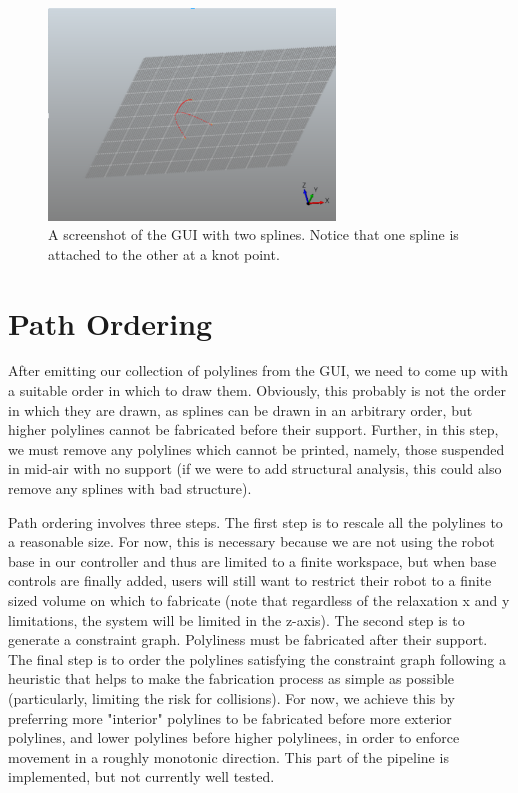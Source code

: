 \documentclass[conference]{acmsiggraph}
\begin{document}
\begin{figure}[ht]
  \centering
  \includegraphics[width=3.0in]{images/GUI.png}
  \caption{A screenshot of the GUI with two splines.  Notice that one spline is attached to the other at a knot point.}
  \label{fig:GUI}
\end{figure}

\section{Path Ordering}
After emitting our collection of polylines from the GUI, we need to come up with a suitable order in which to draw them.  Obviously, this probably is not the order in which they are drawn, as splines can be drawn in an arbitrary order, but higher polylines cannot be fabricated before their support.  Further, in this step, we must remove any polylines which cannot be printed, namely, those suspended in mid-air with no support (if we were to add structural analysis, this could also remove any splines with bad structure).

Path ordering involves three steps.  The first step is to rescale all the polylines to a reasonable size.  For now, this is necessary because we are not using the robot base in our controller and thus are limited to a finite workspace, but when base controls are finally added, users will still want to restrict their robot to a finite sized volume on which to fabricate (note that regardless of the relaxation x and y limitations, the system will be limited in the z-axis).  The second step is to generate a constraint graph.  Polyliness must be fabricated after their support.  The final step is to order the polylines satisfying the constraint graph following a heuristic that helps to make the fabrication process as simple as possible (particularly, limiting the risk for collisions).  For now, we achieve this by preferring more "interior" polylines to be fabricated before more exterior polylines, and lower polylines before higher polylinees, in order to enforce movement in a roughly monotonic direction.  This part of the pipeline is implemented, but not currently well tested.
\end{document}
